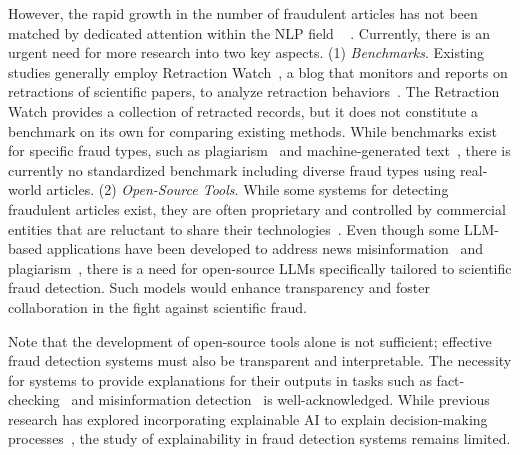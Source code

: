 However,  %
the rapid growth in the number of fraudulent articles %
has not been matched by dedicated attention within the NLP field %
~\cite{byrne2024call}%
. Currently, there is an urgent need for more research into two key aspects.  (1) \emph{Benchmarks}.  
Existing studies generally employ Retraction Watch~\cite{RetractionWatchDatabase}, a blog that monitors and reports on retractions of scientific papers, to analyze retraction behaviors~\cite{shepperd2023analysis, byrne2022protection, freedman2024detecting}.
The Retraction Watch provides a collection of retracted records, but it does not constitute a benchmark on its own for comparing existing methods.
While benchmarks exist for specific fraud types, such as plagiarism~\cite{wahle2021neural} and machine-generated text~\cite{mosca2023distinguishing, abdalla2023benchmark, liyanage2022benchmark}, there is currently no standardized benchmark including diverse fraud types using real-world articles.
(2) \emph{Open-Source Tools}. While some systems for detecting fraudulent articles %
exist, they are often proprietary and controlled by commercial entities that are reluctant to share their technologies~\cite{christopher2021raw}.
Even though some LLM-based applications have been developed to address news misinformation~\cite{cao2024can} and plagiarism~\cite{wahle2022large}, there is a need for open-source LLMs specifically tailored to scientific fraud detection.
Such models would enhance transparency and foster collaboration in the fight against scientific fraud.

Note that the development of open-source tools alone is not sufficient; effective fraud detection systems must also be transparent and interpretable. The necessity for systems to provide explanations for their outputs in tasks such as fact-checking~\cite{kotonya2020explainable} and misinformation detection~\cite{explain-misinformation} is well-acknowledged. 
While previous research has explored incorporating explainable AI to explain decision-making processes~\cite{explainLLMs, kotonya2024towards}, the study of explainability in fraud detection systems remains limited.



